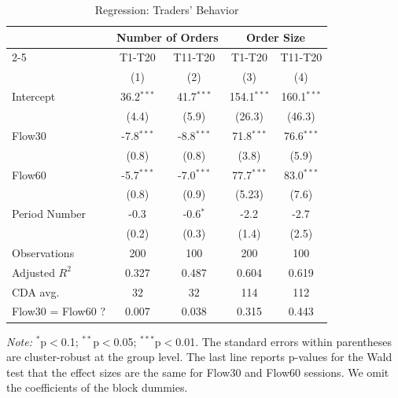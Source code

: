 \documentclass[12pt]{article}
\begin{document}
\begin{table}[H]
\centering    
\caption{Regression: Traders' Behavior}
\begin{threeparttable}
\begin{tabular}{@{\extracolsep{5pt}}lcccc}
\toprule
& \multicolumn{2}{c}{Number of Orders} & \multicolumn{2}{c}{Order Size} \\
\cmidrule{2-5}
& T1-T20 & T11-T20 & T1-T20 & T11-T20 \\
& (1) & (2) & (3) & (4) \\
\midrule
Intercept & 36.2$^{***}$ & 41.7$^{***}$ & 154.1$^{***}$ & 160.1$^{***}$ \\
  & (4.4) & (5.9) & (26.3) & (46.3) \\
Flow30 & -7.8$^{***}$ & -8.8$^{***}$ & 71.8$^{***}$ & 76.6$^{***}$ \\
  & (0.8) & (0.8) & (3.8) & (5.9) \\
Flow60 & -5.7$^{***}$ & -7.0$^{***}$ & 77.7$^{***}$ & 83.0$^{***}$ \\
  & (0.8) & (0.9) & (5.23) & (7.6) \\
Period Number  & -0.3$^{}$ & -0.6$^{*}$ & -2.2$^{}$ & -2.7$^{}$ \\
  & (0.2) & (0.3) & (1.4) & (2.5) \\
\midrule
Observations & 200 & 100 & 200 & 100 \\
Adjusted $R^2$ & 0.327 & 0.487 & 0.604 & 0.619 \\
\midrule
CDA avg. & 32 & 32 & 114 & 112 \\
Flow30 = Flow60 ? & 0.007 & 0.038 & 0.315 & 0.443 \\ %
\bottomrule
\end{tabular}
\begin{tablenotes}
\footnotesize
\textit{Note:} $^{*}$p$<$0.1; $^{**}$p$<$0.05; $^{***}$p$<$0.01. The standard errors within parentheses are cluster-robust at the group level. 
The last line reports p-values for the Wald test that the effect sizes are the same for Flow30 and Flow60 sessions.
We omit the coefficients of the block dummies. 
\end{tablenotes}
\end{threeparttable}
\label{tab:TradersBehavior}
\end{table}
\end{document}

